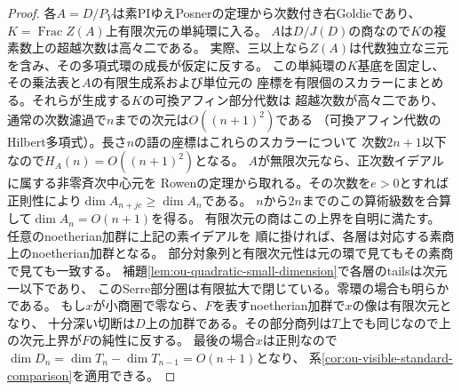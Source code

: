 \documentclass[11pt,a4paper]{ltjsarticle}
\theoremstyle{definition}
\begin{document}
\begin{proof}
各$A=D/P_Y$は素PIゆえPosnerの定理から次数付き右Goldieであり、
$K=\operatorname{Frac} Z(A)$上有限次元の単純環に入る。
$A$は$D/J(D)$の商なので$K$の複素数上の超越次数は高々二である。
実際、三以上なら$Z(A)$は代数独立な三元を含み、その多項式環の成長が仮定に反する。
この単純環の$K$基底を固定し、その乗法表と$A$の有限生成系および単位元の
座標を有限個のスカラーにまとめる。それらが生成する$K$の可換アフィン部分代数は
超越次数が高々二であり、通常の次数濾過で$n$までの次元は$O((n+1)^2)$である
（可換アフィン代数のHilbert多項式）。長さ$n$の語の座標はこれらのスカラーについて
次数$2n+1$以下なので$H_A(n)=O((n+1)^2)$となる。
$A$が無限次元なら、正次数イデアルに属する非零斉次中心元を
Rowenの定理\cite{Rowen1973Center}から取れる。その次数を$e>0$とすれば
正則性により$\dim A_{n+je}\ge\dim A_n$である。
$n$から$2n$までのこの算術級数を合算して$\dim A_n=O(n+1)$を得る。
有限次元の商はこの上界を自明に満たす。
任意のnoetherian加群に上記の素イデアルを
順に掛ければ、各層は対応する素商上のnoetherian加群となる。
部分対象列と有限次元性は元の環で見てもその素商で見ても一致する。
補題\ref{lem:ou-quadratic-small-dimension}で各層のtailsは次元一以下であり、
このSerre部分圏は有限拡大で閉じている。零環の場合も明らかである。
もし$x$が小商圏で零なら、$F$を表すnoetherian加群で$x$の像は有限次元となり、
十分深い切断は$D$上の加群である。その部分商列は$T$上でも同じなので上の次元上界が$F$の純性に反する。
最後の場合$x$は正則なので$\dim D_n=\dim T_n-\dim T_{n-1}=O(n+1)$となり、
系\ref{cor:ou-visible-standard-comparison}を適用できる。
\end{proof}
\end{document}
